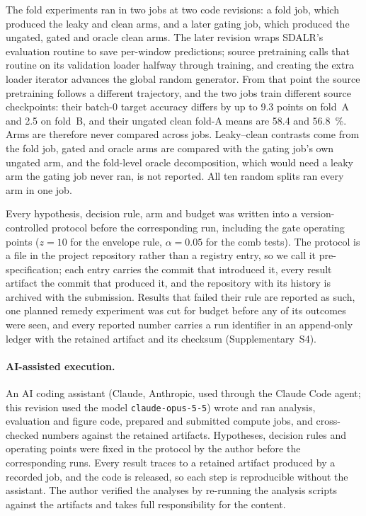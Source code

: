 The fold experiments ran in two jobs at two code revisions: a fold job, which produced the leaky and clean arms, and a later
gating job, which produced the ungated, gated and oracle clean arms. The later revision wraps SDALR's evaluation routine to
save per-window predictions; source pretraining calls that routine on its validation loader halfway through training, and
creating the extra loader iterator advances the global random generator. From that point the source pretraining follows a
different trajectory, and the two jobs train different source checkpoints: their batch-0 target accuracy differs by up to
9.3 points on fold~A and 2.5 on fold~B, and their ungated clean fold-A means are \SI{58.4}{} and \SI{56.8}{\percent}. Arms are
therefore never compared across jobs. Leaky--clean contrasts come from the fold job, gated and oracle arms are compared with
the gating job's own ungated arm, and the fold-level oracle decomposition, which would need a leaky arm the gating job never
ran, is not reported. All ten random splits ran every arm in one job.

Every hypothesis, decision rule, arm and budget was written into a version-controlled protocol before the corresponding
run, including the gate operating points ($z = 10$ for the envelope rule, $\alpha = 0.05$ for the comb tests). The protocol
is a file in the project repository rather than a registry entry, so we call it pre-specification; each entry carries the
commit that introduced it, every result artifact the commit that produced it, and the repository with its history is
archived with the submission. Results that failed their rule are reported as such, one planned remedy experiment was cut
for budget before any of its outcomes were seen, and every reported number carries a run identifier in an append-only ledger
with the retained artifact and its checksum (Supplementary~S4).

\paragraph{AI-assisted execution.} An AI coding assistant (Claude, Anthropic, used through the Claude Code agent; this
revision used the model \texttt{claude-opus-5-5}) wrote and ran analysis, evaluation and figure code, prepared and
submitted compute jobs, and cross-checked numbers against the retained artifacts. Hypotheses, decision rules and operating
points were fixed in the protocol by the author before the corresponding runs. Every result traces to a retained artifact
produced by a recorded job, and the code is released, so each step is reproducible without the assistant. The author
verified the analyses by re-running the analysis scripts against the artifacts and takes full responsibility for the content.

